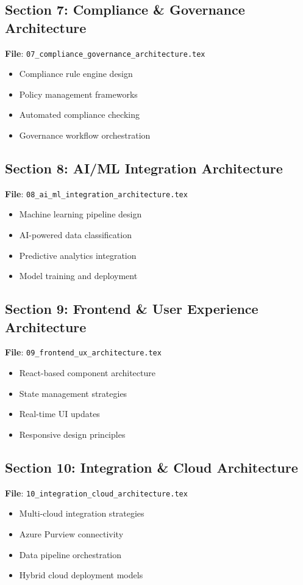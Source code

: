 \documentclass[12pt,a4paper]{article}
\begin{document}
\subsection{Section 7: Compliance \& Governance Architecture}
\textbf{File}: \texttt{07\_compliance\_governance\_architecture.tex}
\begin{itemize}
    \item Compliance rule engine design
    \item Policy management frameworks
    \item Automated compliance checking
    \item Governance workflow orchestration
\end{itemize}

\subsection{Section 8: AI/ML Integration Architecture}
\textbf{File}: \texttt{08\_ai\_ml\_integration\_architecture.tex}
\begin{itemize}
    \item Machine learning pipeline design
    \item AI-powered data classification
    \item Predictive analytics integration
    \item Model training and deployment
\end{itemize}

\subsection{Section 9: Frontend \& User Experience Architecture}
\textbf{File}: \texttt{09\_frontend\_ux\_architecture.tex}
\begin{itemize}
    \item React-based component architecture
    \item State management strategies
    \item Real-time UI updates
    \item Responsive design principles
\end{itemize}

\subsection{Section 10: Integration \& Cloud Architecture}
\textbf{File}: \texttt{10\_integration\_cloud\_architecture.tex}
\begin{itemize}
    \item Multi-cloud integration strategies
    \item Azure Purview connectivity
    \item Data pipeline orchestration
    \item Hybrid cloud deployment models
\end{itemize}
\end{document}
